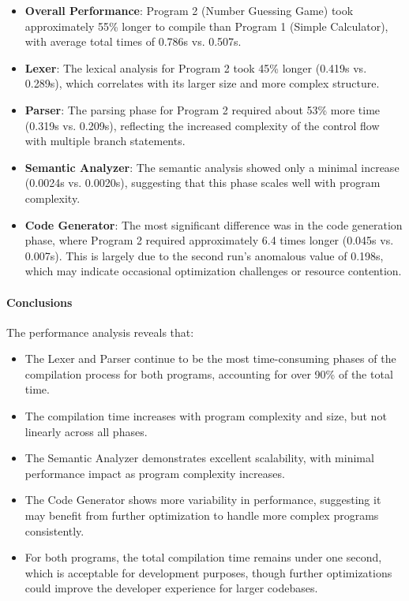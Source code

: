 \documentclass[conference]{IEEEtran}
\begin{document}
\begin{itemize}
	\item \textbf{Overall Performance}: Program 2 (Number Guessing Game) took approximately 55\% longer to compile than Program 1 (Simple Calculator), with average total times of 0.786s vs. 0.507s.
	
	\item \textbf{Lexer}: The lexical analysis for Program 2 took 45\% longer (0.419s vs. 0.289s), which correlates with its larger size and more complex structure.
	
	\item \textbf{Parser}: The parsing phase for Program 2 required about 53\% more time (0.319s vs. 0.209s), reflecting the increased complexity of the control flow with multiple branch statements.
	
	\item \textbf{Semantic Analyzer}: The semantic analysis showed only a minimal increase (0.0024s vs. 0.0020s), suggesting that this phase scales well with program complexity.
	
	\item \textbf{Code Generator}: The most significant difference was in the code generation phase, where Program 2 required approximately 6.4 times longer (0.045s vs. 0.007s). This is largely due to the second run's anomalous value of 0.198s, which may indicate occasional optimization challenges or resource contention.
\end{itemize}

\paragraph{Conclusions}
The performance analysis reveals that:

\begin{itemize}
	\item The Lexer and Parser continue to be the most time-consuming phases of the compilation process for both programs, accounting for over 90\% of the total time.
	
	\item The compilation time increases with program complexity and size, but not linearly across all phases.
	
	\item The Semantic Analyzer demonstrates excellent scalability, with minimal performance impact as program complexity increases.
	
	\item The Code Generator shows more variability in performance, suggesting it may benefit from further optimization to handle more complex programs consistently.
	
	\item For both programs, the total compilation time remains under one second, which is acceptable for development purposes, though further optimizations could improve the developer experience for larger codebases.
\end{itemize}
\end{document}
